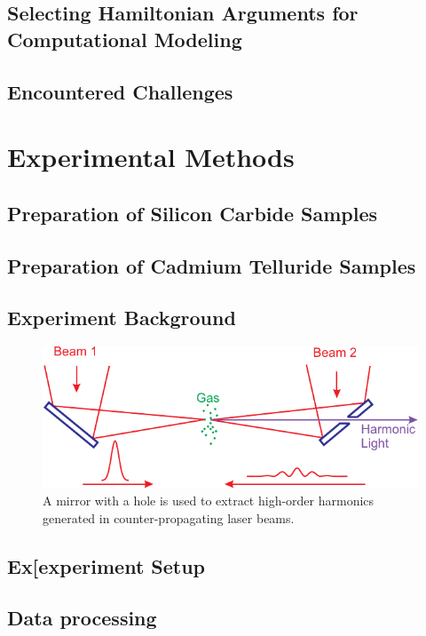 \documentclass[oneside, astronomy, noacknowlegments]{BYUPhys}
\begin{document}
\section{Selecting Hamiltonian Arguments for Computational Modeling}
\section{Encountered Challenges}

\chapter{Experimental Methods}
\section{Preparation of Silicon Carbide Samples}
\section{Preparation of Cadmium Telluride Samples}
\section{Experiment Background}

\begin{figure}
    \centerline{\includegraphics{Graphic1}}
    \caption[SiC energy levels and zero-field splitting]{\label{fig:SiCZeeman}
     A mirror with a hole is used to extract high-order harmonics generated in
     counter-propagating laser beams.}
 \end{figure}

\section{Ex[experiment Setup}
\section{Data processing}
\end{document}
